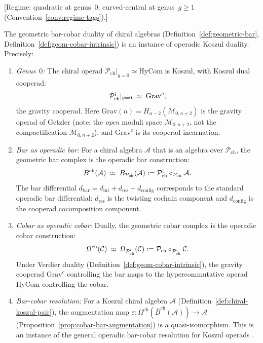 \begin{theorem}\label{thm:prism-operadic}
\textup{[Regime: quadratic at genus~$0$; curved-central at genus~$g \geq 1$
\textup{(}Convention~\textup{\ref{conv:regime-tags})}.]}

The geometric bar-cobar duality of chiral algebras
(Definition~\ref{def:geometric-bar},
Definition~\ref{def:geom-cobar-intrinsic}) is an instance of operadic
Koszul duality. Precisely:
\begin{enumerate}[label=\textup{(\roman*)}]
\item \emph{Genus~$0$:} The chiral operad
 $\mathcal{P}_{\mathrm{ch}}|_{g=0} \simeq \mathrm{HyCom}$ is Koszul,
 with Koszul dual cooperad:
 \[
 \mathcal{P}_{\mathrm{ch}}^{\text{\textexclamdown}}|_{g=0}
 \;\simeq\; \mathrm{Grav}^c,
 \]
 the gravity cooperad. Here $\mathrm{Grav}(n) =
 H_{n-2}(\mathcal{M}_{0,n+2})$ is the gravity operad
 of Getzler \cite{Get95} (note: the \emph{open} moduli space
 $\mathcal{M}_{0,n+2}$, not the compactification $\overline{\mathcal{M}}_{0,n+2}$), and $\mathrm{Grav}^c$ is its cooperad
 incarnation.

\item \emph{Bar as operadic bar:} For a chiral algebra $\mathcal{A}$
 that is an algebra over $\mathcal{P}_{\mathrm{ch}}$, the geometric
 bar complex is the operadic bar construction:
 \[
 \bar{B}^{\mathrm{ch}}(\mathcal{A})
 \;\simeq\;
 B_{\mathcal{P}_{\mathrm{ch}}}(\mathcal{A})
 := \mathcal{P}_{\mathrm{ch}}^{\text{\textexclamdown}}
 \circ_{\mathcal{P}_{\mathrm{ch}}} \mathcal{A}.
 \]
 The bar differential $d_{\mathrm{bar}} = d_{\mathrm{int}} +
 d_{\mathrm{res}} + d_{\mathrm{config}}$ corresponds to the
 standard operadic bar differential: $d_{\mathrm{res}}$ is the
 twisting cochain component and $d_{\mathrm{config}}$ is the
 cooperad cocomposition component.

\item \emph{Cobar as operadic cobar:} Dually, the geometric cobar
 complex is the operadic cobar construction:
 \[
 \Omega^{\mathrm{ch}}(\mathcal{C})
 \;\simeq\;
 \Omega_{\mathcal{P}_{\mathrm{ch}}^{\text{\textexclamdown}}}(\mathcal{C})
 := \mathcal{P}_{\mathrm{ch}}
 \circ_{\mathcal{P}_{\mathrm{ch}}^{\text{\textexclamdown}}} \mathcal{C}.
 \]
 Under Verdier duality
 (Definition~\ref{def:geom-cobar-intrinsic}), the gravity cooperad
 $\mathrm{Grav}^c$ controlling the bar maps to the hypercommutative
 operad $\mathrm{HyCom}$ controlling the cobar.

\item \emph{Bar-cobar resolution:} For a Koszul chiral algebra
 $\mathcal{A}$ (Definition~\ref{def:chiral-koszul-pair}), the
 augmentation map
 $\varepsilon\colon
 \Omega^{\mathrm{ch}}(\bar{B}^{\mathrm{ch}}(\mathcal{A}))
 \to \mathcal{A}$
 (Proposition~\ref{prop:cobar-bar-augmentation})
 is a quasi-isomorphism. This is an instance of the general operadic
 bar-cobar resolution for Koszul operads \cite[Theorem~11.3.3]{LV12}.
\end{enumerate}
\end{theorem}

